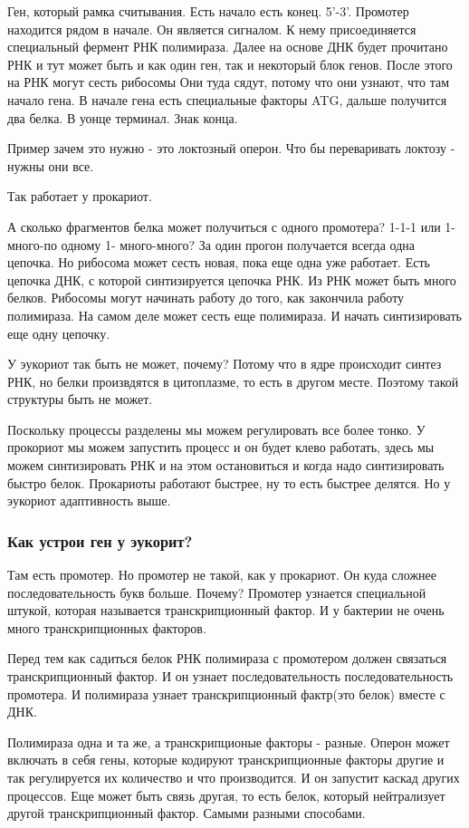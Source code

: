 Ген, который рамка считывания. Есть начало есть конец. 5'-3'. Промотер 
находится рядом в начале. Он является сигналом. К нему присоединяется 
специальный фермент РНК полимираза.  Далее на основе ДНК будет прочитано 
РНК и тут может быть и как один ген, так и некоторый блок генов. После этого 
на РНК могут сесть рибосомы Они туда сядут, потому что они узнают, что 
там начало гена. В начале гена есть специальные факторы ATG, дальше 
получится два белка. В уонце терминал. Знак конца.

Пример зачем это нужно - это локтозный оперон. Что бы переваривать локтозу - нужны они
все.  

Так работает у прокариот. 

А сколько фрагментов белка может получиться с одного промотера? 
1-1-1 или 1-много-по одному 1- много-много? За один прогон получается 
всегда одна цепочка. Но рибосома может сесть новая, пока еще одна уже работает. 
Есть цепочка ДНК, с которой синтизируется цепочка РНК. Из РНК может 
быть много белков. Рибосомы могут начинать работу до того, 
как закончила работу полимираза. На самом деле может 
сесть еще полимираза. И начать синтизировать еще одну цепочку. 

У эукориот так быть не может, почему? 
Потому что в ядре происходит синтез РНК, но белки произвдятся в цитоплазме, 
то есть в другом месте. Поэтому такой структуры быть не может. 

Поскольку процессы разделены мы можем регулировать все более тонко. 
У прокориот мы можем запустить процесс и он будет клево работать, 
здесь мы можем синтизировать РНК и на этом остановиться и 
когда надо синтизировать быстро белок. Прокариоты работают быстрее, 
ну то есть быстрее делятся. Но у эукориот адаптивность выше. 

\subsubsection{Как устрои ген у эукорит?} 
Там есть промотер. Но промотер не такой, как у прокариот. Он 
куда сложнее последовательность букв больше. Почему? Промотер 
узнается специальной штукой, которая называется 
транскрипционный фактор. И у бактерии не очень много транскрипционных 
факторов. 

Перед тем как садиться белок РНК полимираза с промотером
должен связаться транскрипционный фактор. И он узнает последовательность
последовательность промотера. И полимираза узнает
транскрипционный фактр(это белок) вместе с ДНК.

Полимираза одна и та же, а транскрипционые факторы - разные.
Оперон может включать в себя гены, которые кодируют транскрипционные факторы другие и 
так регулируется их количество и что производится. И он запустит каскад других процессов. 
Еще может быть связь другая, то есть белок, который нейтрализует другой транскрипционный фактор. 
Самыми разными способами. 

